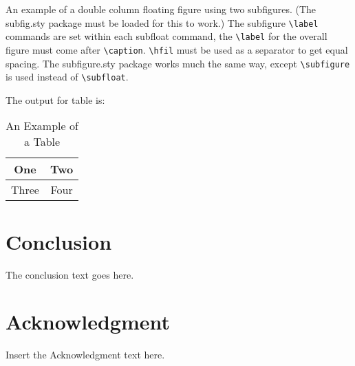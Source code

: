 \documentclass{cta-author}%
\begin{document}
 An example of a double column floating figure using two subfigures.
 (The subfig.sty package must be loaded for this to work.)
 The subfigure \verb+\label+ commands are set within each subfloat command, the
 \verb+\label+ for the overall figure must come after \verb+\caption+.
 \verb+\hfil+ must be used as a separator to get equal spacing.
 The subfigure.sty package works much the same way, except \verb+\subfigure+ is
 used instead of \verb+\subfloat+.


\vskip2pc

\noindent The output for table is:

\begin{table}[!h]
\caption{An Example of a Table}%
\label{table_example}
\centering
\begin{tabular}{|c||c|}%
\hline
One & Two\\ %
\hline
Three & Four\\%
\hline
\end{tabular}
\end{table}%

\section{Conclusion}
The conclusion text goes here.

\section*{Acknowledgment}

Insert the Acknowledgment text here.


%
%
%

\end{document}
